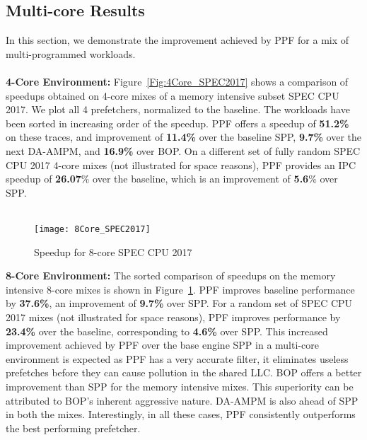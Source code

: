 \subsection{Multi-core Results}
\label{Results-Multi}
In this section, we demonstrate the improvement achieved by PPF for a mix of
multi-programmed workloads.\\ \\
%
\noindent \textbf{4-Core Environment:}
Figure~\ref{Fig:4Core_SPEC2017} shows a comparison of speedups obtained on
4-core mixes of a memory intensive subset SPEC CPU 2017. We plot all 4
prefetchers, normalized to the baseline. The workloads have been sorted in
increasing order of the speedup. PPF offers a speedup of \textbf{51.2\%} on
these traces, and improvement of \textbf{11.4\%} over the baseline SPP,
\textbf{9.7\%} over the next DA-AMPM, and \textbf{16.9\%} over BOP.
On a different set of fully random SPEC CPU 2017 4-core mixes (not illustrated
for space reasons), PPF provides an IPC speedup of \textbf{26.07}\% over the
baseline, which is an improvement of \textbf{5.6}\% over SPP.\\ \\
%
\begin{figure}[ht]
\texttt{[image: 8Core\_SPEC2017]}
\caption{Speedup for 8-core SPEC CPU 2017}
\label{Fig:8Core_SPEC2017}
\end{figure}
%
\noindent \textbf{8-Core Environment:}
The sorted comparison of speedups on the memory intensive 8-core mixes is
shown in Figure~\ref{Fig:8Core_SPEC2017}. PPF improves baseline performance
by \textbf{37.6\%}, an improvement of \textbf{9.7\%} over SPP. For a random
set of SPEC CPU 2017 mixes (not illustrated for space reasons), PPF improves
performance by \textbf{23.4\%} over the baseline, corresponding to
\textbf{4.6\%} over SPP. This increased improvement achieved by PPF over the
base engine SPP in a multi-core environment is expected as PPF has a very
accurate filter, it eliminates useless prefetches before they can cause
pollution in the shared LLC.
BOP offers a better improvement than SPP for the memory intensive mixes. This
superiority can be attributed to BOP's inherent aggressive nature. DA-AMPM is
also ahead of SPP in both the mixes. Interestingly, in all these cases, PPF
consistently outperforms the best performing prefetcher.


